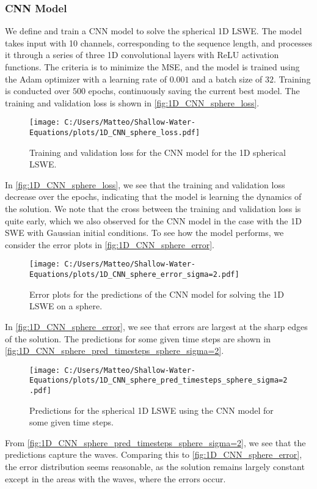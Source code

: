 \subsubsection*{CNN Model}
We define and train a CNN model to solve the spherical 1D LSWE.
The model takes input with 10 channels, corresponding to the sequence length, and processes it through a series of three 1D convolutional layers with ReLU activation functions.
The criteria is to minimize the MSE, and the model is trained using the Adam optimizer with a learning rate of $0.001$ and a batch size of $32$.
Training is conducted over $500$ epochs, continuously saving the current best model.
The training and validation loss is shown in \autoref{fig:1D_CNN_sphere_loss}.
\begin{figure}[H]
    \centering
    \texttt{[image: C:/Users/Matteo/Shallow-Water-Equations/plots/1D\_CNN\_sphere\_loss.pdf]}
    \caption{Training and validation loss for the CNN model for the 1D spherical LSWE.}\label{fig:1D_CNN_sphere_loss}
\end{figure}
In \autoref{fig:1D_CNN_sphere_loss}, we see that the training and validation loss decrease over the epochs, indicating that the model is learning the dynamics of the solution.
We note that the cross between the training and validation loss is quite early, which we also observed for the CNN model in the case with the 1D SWE with Gaussian initial conditions.
To see how the model performs, we consider the error plots in \autoref{fig:1D_CNN_sphere_error}.
\begin{figure}[H]
    \centering
    \texttt{[image: C:/Users/Matteo/Shallow-Water-Equations/plots/1D\_CNN\_sphere\_error\_sigma=2.pdf]}
    \caption{Error plots for the predictions of the CNN model for solving the 1D LSWE on a sphere.}\label{fig:1D_CNN_sphere_error}
\end{figure}
In \autoref{fig:1D_CNN_sphere_error}, we see that errors are largest at the sharp edges of the solution.
The predictions for some given time steps are shown in \autoref{fig:1D_CNN_sphere_pred_timesteps_sphere_sigma=2}.
\begin{figure}[H]
    \centering
    \texttt{[image: C:/Users/Matteo/Shallow-Water-Equations/plots/1D\_CNN\_sphere\_pred\_timesteps\_sphere\_sigma=2.pdf]}
    \caption{Predictions for the spherical 1D LSWE using the CNN model for some given time steps.}\label{fig:1D_CNN_sphere_pred_timesteps_sphere_sigma=2}
\end{figure}
From \autoref{fig:1D_CNN_sphere_pred_timesteps_sphere_sigma=2}, we see that the predictions capture the waves.
Comparing this to \autoref{fig:1D_CNN_sphere_error}, the error distribution seems reasonable, as the solution remains largely constant except in the areas with the waves, where the errors occur.

